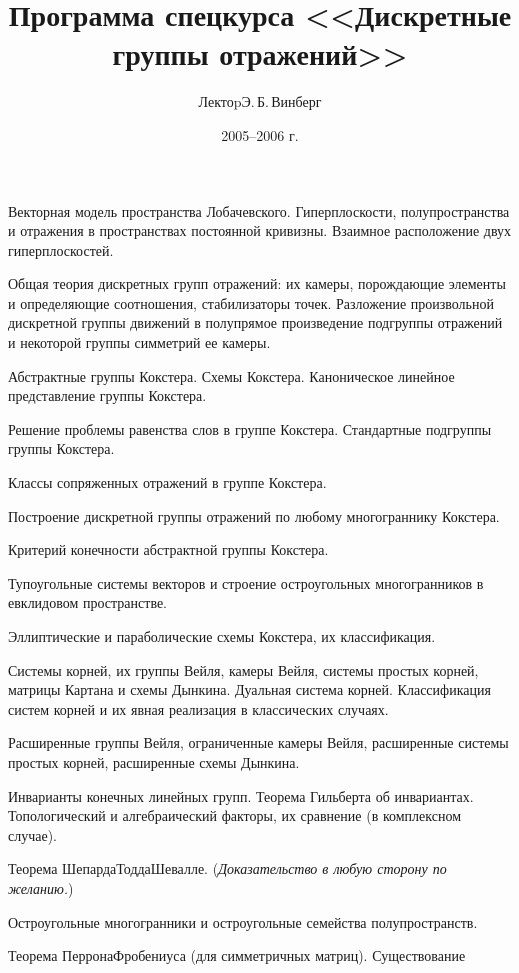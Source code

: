 \documentclass[a4paper]{article}
\title{Программа спецкурса <<Дискретные группы отражений>>}
\author{Лектоp\т Э.\,Б.\,Винберг}
\date{2005--2006 г.}
\begin{document}
\maketitle

\begin{nums}{0}
\item Векторная модель пространства Лобачевского. Гиперплоскости,
      полупространства и отражения в пространствах постоянной кривизны.
      Взаимное расположение двух гиперплоскостей.
\item Общая теория дискретных групп отражений: их камеры, порождающие
      элементы и определяющие соотношения, стабилизаторы точек. Разложение
      произвольной дискретной группы движений в полупрямое произведение
      подгруппы отражений и некоторой группы симметрий ее камеры.
\item Абстрактные группы Кокстера. Схемы Кокстера. Каноническое линейное
      представление группы Кокстера.
\item Решение проблемы равенства слов в группе Кокстера. Стандартные
      подгруппы группы Кокстера.
\item Классы сопряженных отражений в группе Кокстера.
\item Построение дискретной группы отражений по любому многограннику Кокстера.
\item Критерий конечности абстрактной группы Кокстера.
\item Тупоугольные системы векторов и строение остроугольных многогранников
      в евклидовом пространстве.
\item Эллиптические и параболические схемы Кокстера, их классификация.
\item Системы корней, их группы Вейля, камеры Вейля, системы простых корней,
      матрицы Картана и схемы Дынкина. Дуальная система корней.
      Классификация систем корней и их явная реализация в классических случаях.
\item Расширенные группы Вейля, ограниченные камеры Вейля, расширенные
      системы простых корней, расширенные схемы Дынкина.
\item Инварианты конечных линейных групп. Теорема Гильберта об инвариантах.
      Топологический и алгебраический факторы, их сравнение (в комплексном случае).
\item Теорема Шепарда\ч Тодда\ч Шевалле. (\emph{Доказательство в любую сторону по желанию.})
\item Остроугольные многогранники и остроугольные семейства полупространств.
\item Теорема Перрона\ч Фробениуса (для симметричных матриц). Существование

\end{nums}
\end{document}
